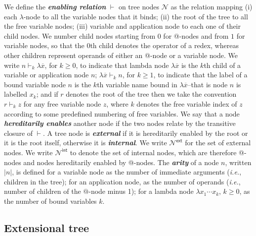 \documentclass[xchauthor,chkrefs,GCNS,amsmath,amsthm,rotating,leaveRGB]{tcsg}
\renewcommand{\index}[1]{}
\theoremstyle{plain}
\theoremstyle{definition}
\newcommand{\Nodes}{\mathcal{N}}
\newcommand{\enables}{\vdash}
\newcommand{\ExternalNodes}{\Nodes^{\mathsf{ext}}}
\newcommand{\InternalNodes}{\Nodes^{\mathsf{int}}}
\begin{document}
We define the \textbf{\emph{enabling relation}}\index{enabling relation}
$\enables $ on tree nodes $\Nodes $ as the relation mapping (i) each $\lambda
$-node to all the variable nodes that it binds; (ii) the root of the tree to
all the free variable nodes; (iii) variable and application node to each one
of their child nodes. We number child nodes starting from $0$ for @-nodes and
from $1$ for variable nodes, so that the $0$th child denotes the operator of
a redex, whereas other children represent operands of either an @-node or a
variable node. We write $n \enables _{k} \lambda \overline{x}$, for $k\geq
0$, to indicate that lambda node $\lambda \overline{x}$ is the $k$th child of
a variable or application node $n$; $\lambda \overline{x} \enables _{k} n$,
for $k\geq 1$, to indicate that the label of a bound variable node $n$ is the
$k$th variable name bound in $\lambda \overline{x}$--that is node $n$ is
labelled $x_{k}$; and if $r$ denotes the root of the tree then we take the
convention $r \enables _{k} z$ for any free variable node $z$, where $k$
denotes the free variable index of $z$ according to some predefined numbering
of free variables. We say that a node \textbf{\emph{hereditarily
enables}}\index{hereditarily enables} another node if the two nodes relate by
the transitive closure of $\enables $. A tree node is
\textbf{\emph{external}}\index{external} if it is hereditarily enabled by the
root or it is the root itself, otherwise it is
\textbf{\emph{internal}}\index{internal}. We write $\ExternalNodes $ for the
set of external nodes. We write $\InternalNodes $ to denote the set of
internal nodes, which are therefore @-nodes and nodes hereditarily enabled by
@-nodes. The \textbf{\emph{arity}}\index{arity} of a node $n$, written $|n|$,
is defined for a variable node as the number of immediate arguments
(\textit{i.e.}, children in the tree); for an application node, as the number
of operands (\textit{i.e.}, number of children of the $@$-node minus 1); for
a lambda node $\lambda x_{1} \cdots x_{k}$, $k\geq 0$, as the number of bound
variables $k$.

\subsection{Extensional tree}\label{sec2.4}
\end{document}
